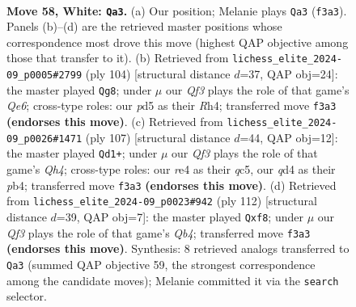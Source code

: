 \documentclass[11pt]{article}
\begin{document}
\clearpage

\begin{figure}[p]\centering
\begin{subfigure}{0.46\textwidth}\centering
\resizebox{\linewidth}{!}{%
\newchessgame
\chessboard[
  setfen={8/8/5pk1/3p4/3qr3/5QP1/P5KP/8 w - - 10 58},
  showmover=false,
  pgfstyle=straightmove, color=movearrow, markmove={f3-a3}
]}
\caption{}
\end{subfigure}\hfill
\begin{subfigure}{0.46\textwidth}\centering
\resizebox{\linewidth}{!}{%
\newchessgame
\chessboard[
  setfen={8/kp1r4/p3Q3/8/1P5R/4P3/5PK1/3q4 w - - 6 53},
  showmover=false,
  pgfstyle=straightmove, color=movearrow, markmove={e6-g8}
]}
\caption{}
\end{subfigure}
\\[4pt]
\begin{subfigure}{0.46\textwidth}\centering
\resizebox{\linewidth}{!}{%
\newchessgame
\chessboard[
  setfen={8/8/6pk/2Q4q/pP6/P2K4/5P2/8 b - - 4 54},
  showmover=false,
  pgfstyle=straightmove, color=movearrow, markmove={h5-d1}
]}
\caption{}
\end{subfigure}\hfill
\begin{subfigure}{0.46\textwidth}\centering
\resizebox{\linewidth}{!}{%
\newchessgame
\chessboard[
  setfen={5r2/8/2k5/3q1p2/1Q6/P7/1P6/1K6 w - - 2 57},
  showmover=false,
  pgfstyle=straightmove, color=movearrow, markmove={b4-f8}
]}
\caption{}
\end{subfigure}
\caption{\textbf{Move 58, White: \texttt{Qa3}.} (a) Our position; Melanie plays \texttt{Qa3} (\texttt{f3a3}). Panels (b)--(d) are the retrieved master positions whose correspondence most drove this move (highest QAP objective among those that transfer to it). (b) Retrieved from \texttt{lichess\_elite\_2024-09\_p0005\#2799} (ply 104) [structural distance $d$=37, QAP obj=24]: the master played \texttt{Qg8}; under $\mu$ our \emph{Qf3} plays the role of that game's \emph{Qe6}; cross-type roles: our \emph{p}d5 as their \emph{R}h4; transferred move \texttt{f3a3} \textbf{(endorses this move)}. (c) Retrieved from \texttt{lichess\_elite\_2024-09\_p0026\#1471} (ply 107) [structural distance $d$=44, QAP obj=12]: the master played \texttt{Qd1+}; under $\mu$ our \emph{Qf3} plays the role of that game's \emph{Qh4}; cross-type roles: our \emph{r}e4 as their \emph{q}c5, our \emph{q}d4 as their \emph{p}b4; transferred move \texttt{f3a3} \textbf{(endorses this move)}. (d) Retrieved from \texttt{lichess\_elite\_2024-09\_p0023\#942} (ply 112) [structural distance $d$=39, QAP obj=7]: the master played \texttt{Qxf8}; under $\mu$ our \emph{Qf3} plays the role of that game's \emph{Qb4}; transferred move \texttt{f3a3} \textbf{(endorses this move)}. Synthesis: 8 retrieved analogs transferred to \texttt{Qa3} (summed QAP objective 59, the strongest correspondence among the candidate moves); Melanie committed it via the \texttt{search} selector.}
\label{fig:thought-m114}
\end{figure}
\end{document}
